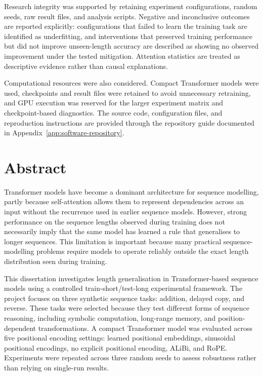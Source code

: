 \documentclass[
    author={Aanchala Ravindra Bhongade},
    supervisor={Dr. Fernando Moreno-Pino},
    degree={MSc},
    title={Length Generalisation in Transformer-Based Sequence Models: Failure Taxonomy and Mitigation Strategies},
    subtitle={},
    type={},
    year={2026}
]{dissertation}
\begin{document}
Research integrity was supported by retaining experiment configurations, random seeds, raw result files, and analysis scripts. Negative and inconclusive outcomes are reported explicitly: configurations that failed to learn the training task are identified as underfitting, and interventions that preserved training performance but did not improve unseen-length accuracy are described as showing no observed improvement under the tested mitigation. Attention statistics are treated as descriptive evidence rather than causal explanations.

Computational resources were also considered. Compact Transformer models were used, checkpoints and result files were retained to avoid unnecessary retraining, and GPU execution was reserved for the larger experiment matrix and checkpoint-based diagnostics. The source code, configuration files, and reproduction instructions are provided through the repository guide documented in Appendix~\ref{app:software-repository}.


\chapter*{Abstract}

\noindent
Transformer models have become a dominant architecture for sequence modelling, partly because self-attention allows them to represent dependencies across an input without the recurrence used in earlier sequence models. However, strong performance on the sequence lengths observed during training does not necessarily imply that the same model has learned a rule that generalises to longer sequences. This limitation is important because many practical sequence-modelling problems require models to operate reliably outside the exact length distribution seen during training.

This dissertation investigates length generalisation in Transformer-based sequence models using a controlled train-short/test-long experimental framework. The project focuses on three synthetic sequence tasks: addition, delayed copy, and reverse. These tasks were selected because they test different forms of sequence reasoning, including symbolic computation, long-range memory, and position-dependent transformations. A compact Transformer model was evaluated across five positional encoding settings: learned positional embeddings, sinusoidal positional encodings, no explicit positional encoding, ALiBi, and RoPE. Experiments were repeated across three random seeds to assess robustness rather than relying on single-run results.
\end{document}
